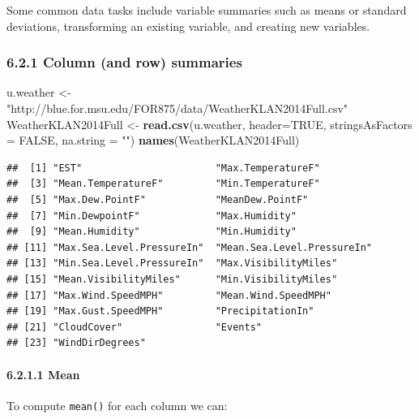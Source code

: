 \documentclass[]{article}
\newenvironment{Shaded}{\begin{snugshade}}{\end{snugshade}}
\newcommand{\KeywordTok}[1]{\textcolor[rgb]{0.13,0.29,0.53}{\textbf{#1}}}
\newcommand{\DataTypeTok}[1]{\textcolor[rgb]{0.13,0.29,0.53}{#1}}
\newcommand{\StringTok}[1]{\textcolor[rgb]{0.31,0.60,0.02}{#1}}
\newcommand{\OtherTok}[1]{\textcolor[rgb]{0.56,0.35,0.01}{#1}}
\newcommand{\OperatorTok}[1]{\textcolor[rgb]{0.81,0.36,0.00}{\textbf{#1}}}
\newcommand{\NormalTok}[1]{#1}
\let\oldparagraph\paragraph
\renewcommand{\paragraph}[1]{\oldparagraph{#1}\mbox{}}
\begin{document}
Some common data tasks include variable summaries such as means or
standard deviations, transforming an existing variable, and creating new
variables.

\subsubsection{6.2.1 Column (and row)
summaries}\label{column-and-row-summaries}

\begin{Shaded}
\begin{Highlighting}[]
\NormalTok{u.weather <-}\StringTok{ "http://blue.for.msu.edu/FOR875/data/WeatherKLAN2014Full.csv"}
\NormalTok{WeatherKLAN2014Full <-}\StringTok{ }\KeywordTok{read.csv}\NormalTok{(u.weather, }\DataTypeTok{header=}\OtherTok{TRUE}\NormalTok{, }\DataTypeTok{stringsAsFactors =} \OtherTok{FALSE}\NormalTok{, }\DataTypeTok{na.string =} \StringTok{""}\NormalTok{)}
\KeywordTok{names}\NormalTok{(WeatherKLAN2014Full)}
\end{Highlighting}
\end{Shaded}

\begin{verbatim}
##  [1] "EST"                       "Max.TemperatureF"         
##  [3] "Mean.TemperatureF"         "Min.TemperatureF"         
##  [5] "Max.Dew.PointF"            "MeanDew.PointF"           
##  [7] "Min.DewpointF"             "Max.Humidity"             
##  [9] "Mean.Humidity"             "Min.Humidity"             
## [11] "Max.Sea.Level.PressureIn"  "Mean.Sea.Level.PressureIn"
## [13] "Min.Sea.Level.PressureIn"  "Max.VisibilityMiles"      
## [15] "Mean.VisibilityMiles"      "Min.VisibilityMiles"      
## [17] "Max.Wind.SpeedMPH"         "Mean.Wind.SpeedMPH"       
## [19] "Max.Gust.SpeedMPH"         "PrecipitationIn"          
## [21] "CloudCover"                "Events"                   
## [23] "WindDirDegrees"
\end{verbatim}

\paragraph{6.2.1.1 Mean}\label{mean}

To compute \texttt{mean()} for each column we can:

\begin{Shaded}
\end{Shaded}
\end{document}
